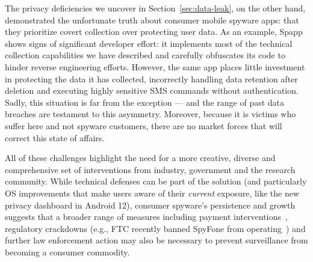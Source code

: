 The privacy deficiencies we uncover in Section~\ref{sec:data-leak}, on
the other hand, demonstrated the unfortunate truth about consumer
mobile spyware apps: that they prioritize covert collection over
protecting user data.  As an example, Spapp shows signs of
significant developer effort: it implements most of the technical
collection capabilities we have described and carefully obfuscates its
code to hinder reverse engineering efforts. However, the same app
places little investment in protecting the data it has collected,
incorrectly handling data retention after deletion and executing
highly sensitive SMS commands without authentication.  Sadly, this
situation is far from the exception --- and the range of past data
breaches are testament to this asymmetry.  Moreover, because it is
victims who suffer here and not spyware customers, there are no market
forces that will correct this state of affairs.

All of these challenges highlight the need for a more creative,
diverse and comprehensive set of interventions from industry,
government and the research community.  While technical defenses can
be part of the solution (and particularly OS improvements that make
users aware of their \emph{current} exposure, like the new privacy
dashboard in Android 12), consumer spyware's persistence and growth
suggests that a broader range of measures including payment
interventions~\cite{mccoy2012priceless}, regulatory crackdowns (e.g., FTC
recently banned SpyFone from operating~\cite{FTCFinal26:online}) and
further law enforcement action may also be necessary to prevent
surveillance from becoming a consumer commodity.




